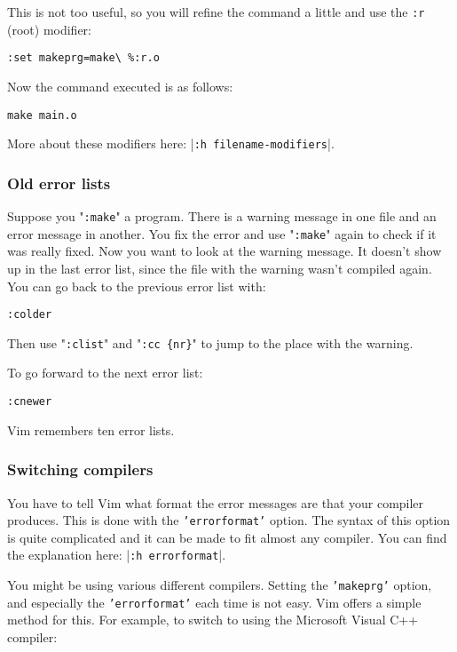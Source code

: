 This is not too useful, so you will refine the command a little and use the \texttt{:r} (root) modifier:

\begin{Verbatim}[samepage=true]
 :set makeprg=make\ %:r.o
\end{Verbatim}

Now the command executed is as follows:

\begin{Verbatim}[samepage=true]
 make main.o
\end{Verbatim}

More about these modifiers here: |\texttt{:h filename-modifiers}|.
\subsubsection{Old error lists}
Suppose you "\texttt{:make}" a program.
There is a warning message in one file and an error message in another.
You fix the error and use "\texttt{:make}" again to check if it was really fixed.
Now you want to look at the warning message.
It doesn't show up in the last error list, since the file with the warning wasn't compiled again.
You can go back to the previous error list with:

\begin{Verbatim}[samepage=true]
 :colder
\end{Verbatim}

Then use "\texttt{:clist}" and "\texttt{:cc \{nr\}}" to jump to the place with the warning.

To go forward to the next error list:

\begin{Verbatim}[samepage=true]
 :cnewer
\end{Verbatim}

Vim remembers ten error lists.
\subsubsection{Switching compilers}
You have to tell Vim what format the error messages are that your compiler produces.
This is done with the \texttt{'errorformat'} option.
The syntax of this option is quite complicated and it can be made to fit almost any compiler.
You can find the explanation here: |\texttt{:h errorformat}|.

You might be using various different compilers.
Setting the \texttt{'makeprg'} option, and especially the \texttt{'errorformat'} each time is not easy.
Vim offers a simple method for this.
For example, to switch to using the Microsoft Visual C++ compiler:

